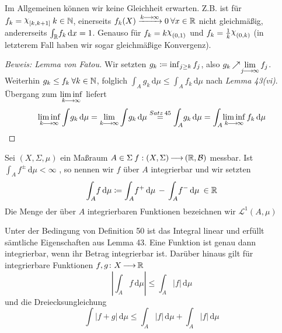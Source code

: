 \documentclass[skript.tex]{subfiles}
\begin{document}
		\begin{bem}
			Im Allgemeinen können wir keine Gleichheit erwarten. Z.B. ist für $f_k=\rchi_{[k,k+1]} \: k\in\N$, einerseits $f_k(X) \xrightarrow{k\kern -1pt \longrightarrow \kern -1pt\infty}0 \: \forall x\in\mathbb{R}$ nicht gleichmäßig, andererseits $\int_{\mathbb{R}} \! f_k \, \mathrm{d}x=1$. Genauso für $f_k=k\rchi_{(0,1)}$ und $f_k=\frac{1}{k}\rchi_{(0,k)}$ (in letzterem Fall haben wir sogar gleichmäßige Konvergenz).
		\end{bem}
		\begin{proof}[Beweis: Lemma von Fatou]
			Wir setzten $g_k\coloneqq \inf_{j\geq k} f_j$, also $g_k\kern -1pt \nearrow \kern -2pt \lim\limits_{j\kern -1pt \longrightarrow \kern -1pt\infty} f_j$. Weiterhin $g_k\leq f_k \: \forall k\in\mathbb{N}$, folglich $\int_A \! g_k \, \mathrm{d}\mu\leq\int_A \! f_k \, \mathrm{d}\mu$ nach \textit{Lemma 43(vi)}. Übergang zum $\liminf\limits_{k\kern -1pt \longrightarrow \kern -1pt\infty}$ liefert
			\begin{equation*}
				\liminf_{k\kern -1pt \longrightarrow \kern -1pt\infty}\int \! g_k \, \mathrm{d}\mu= \lim\limits_{k\kern -1pt \longrightarrow \kern -1pt\infty} \int \! g_k \, \mathrm{d}\mu \stackrel{Satz \: 45}= \int_A \! g_k \, \mathrm{d}\mu = \int_A \! \liminf\limits_{k\kern -1pt \longrightarrow \kern -1pt\infty} f_k \, \mathrm{d}\mu
			\end{equation*}
		\end{proof}

		\begin{defin}
			Sei $(X,\Sigma,\mu)$ ein Maßraum $A\in\Sigma \: f:(X,\Sigma) \kern -1pt \longrightarrow \kern -1pt (\mathbb{R},\mathcal{B})$ messbar. Ist $ \int_A \! f^\pm \, \mathrm{d}\mu<\infty$ , so nennen wir $f$ über $A$ integrierbar und wir setzten
			\begin{equation*}
				\int_A \! f \, \mathrm{d}\mu\coloneqq \int_A \! f^+ \, \mathrm{d}\mu \, - \, \int_A \! f^- \, \mathrm{d}\mu \: \in\mathbb{R}
			\end{equation*}
			Die Menge der über $A$ integrierbaren Funktionen bezeichnen wir $\mathscr{L}^1(A,\mu)$
		\end{defin}
		\begin{lem}
			Unter der Bedingung von \textup{Definition 50} ist das Integral linear und erfüllt sämtliche Eigenschaften aus \textup{Lemma 43}. Eine Funktion ist genau dann integrierbar, wenn ihr Betrag integrierbar ist. Darüber hinaus gilt für integrierbare Funktionen $f,g\colon X\kern -1pt \longrightarrow \kern -1pt\mathbb{R}$
			\begin{equation*}
				\left\vert \int_A \! f \, \mathrm{d}\mu\right\vert \leq \int_A \! |f| \, \mathrm{d}\mu
			\end{equation*}
			und die Dreiecksungleichung
			\begin{equation*}
				\int \! |f+g| \, \mathrm{d}\mu \leq \int_A \! |f| \, \mathrm{d}\mu + \int_A \! |f| \, \mathrm{d}\mu
			\end{equation*}
			\end{lem}
\end{document}
